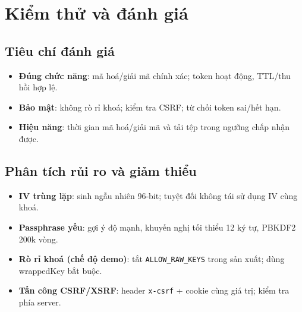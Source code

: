 \chapter{Kiểm thử và đánh giá}

\section{Tiêu chí đánh giá}
\begin{itemize}
  \item \textbf{Đúng chức năng}: mã hoá/giải mã chính xác; token hoạt động, TTL/thu hồi hợp lệ.
  \item \textbf{Bảo mật}: không rò rỉ khoá; kiểm tra CSRF; từ chối token sai/hết hạn.
  \item \textbf{Hiệu năng}: thời gian mã hoá/giải mã và tải tệp trong ngưỡng chấp nhận được.
\end{itemize}

\section{Phân tích rủi ro và giảm thiểu}
\begin{itemize}
  \item \textbf{IV trùng lặp}: sinh ngẫu nhiên 96‑bit; tuyệt đối không tái sử dụng IV cùng khoá.
  \item \textbf{Passphrase yếu}: gợi ý độ mạnh, khuyến nghị tối thiểu 12 ký tự, PBKDF2 200k vòng.
  \item \textbf{Rò rỉ khoá (chế độ demo)}: tắt \texttt{ALLOW\_RAW\_KEYS} trong sản xuất; dùng wrappedKey bắt buộc.
  \item \textbf{Tấn công CSRF/XSRF}: header \texttt{x-csrf} + cookie cùng giá trị; kiểm tra phía server.
\end{itemize}

